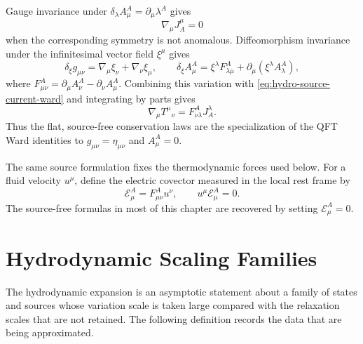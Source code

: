 Gauge invariance under \(\delta_\lambda A^A_\mu=\partial_\mu\lambda^A\)
gives
\begin{equation}
  \nabla_\mu J_A^\mu=0
  \label{eq:hydro-source-current-ward}
\end{equation}
when the corresponding symmetry is not anomalous.  Diffeomorphism invariance
under the infinitesimal vector field \(\xi^\mu\) gives
\[
  \delta_\xi g_{\mu\nu}=\nabla_\mu\xi_\nu+\nabla_\nu\xi_\mu,
  \qquad
  \delta_\xi A^A_\mu
  =
  \xi^\lambda F^A_{\lambda\mu}
  +\partial_\mu(\xi^\lambda A^A_\lambda),
\]
where \(F^A_{\mu\nu}=\partial_\mu A^A_\nu-\partial_\nu A^A_\mu\).  Combining
this variation with \eqref{eq:hydro-source-current-ward} and integrating by
parts gives
\begin{equation}
  \nabla_\mu T^\mu{}_\nu
  =
  F^A_{\nu\lambda}J_A^\lambda .
  \label{eq:hydro-source-stress-ward}
\end{equation}
Thus the flat, source-free conservation laws are the specialization of the
QFT Ward identities to
\(g_{\mu\nu}=\eta_{\mu\nu}\) and \(A^A_\mu=0\).

The same source formulation fixes the thermodynamic forces used below.  For
a fluid velocity \(u^\mu\), define the electric covector measured in the
local rest frame by
\[
  \mathcal E^A_\mu=F^A_{\mu\nu}u^\nu,
  \qquad
  u^\mu \mathcal E^A_\mu=0 .
\]
The source-free formulas in most of this chapter are recovered by setting
\(\mathcal E^A_\mu=0\).

\section{Hydrodynamic Scaling Families}

The hydrodynamic expansion is an asymptotic statement about a family of
states and sources whose variation scale is taken large compared with the
relaxation scales that are not retained.  The following definition records
the data that are being approximated.

